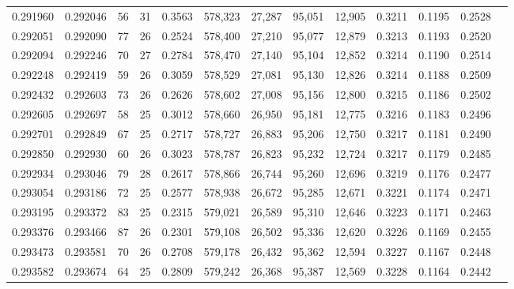 \begin{tabular}{rrrrrrrrrrrrr}
0.291960 & 0.292046 &  56 &  31 &                                     0.3563 & 578,323 &  27,287 &  95,051 &  12,905 & 0.3211 & 0.1195 & 0.2528 \\
0.292051 & 0.292090 &  77 &  26 &                                     0.2524 & 578,400 &  27,210 &  95,077 &  12,879 & 0.3213 & 0.1193 & 0.2520 \\
0.292094 & 0.292246 &  70 &  27 &                                     0.2784 & 578,470 &  27,140 &  95,104 &  12,852 & 0.3214 & 0.1190 & 0.2514 \\
0.292248 & 0.292419 &  59 &  26 &                                     0.3059 & 578,529 &  27,081 &  95,130 &  12,826 & 0.3214 & 0.1188 & 0.2509 \\
0.292432 & 0.292603 &  73 &  26 &                                     0.2626 & 578,602 &  27,008 &  95,156 &  12,800 & 0.3215 & 0.1186 & 0.2502 \\
0.292605 & 0.292697 &  58 &  25 &                                     0.3012 & 578,660 &  26,950 &  95,181 &  12,775 & 0.3216 & 0.1183 & 0.2496 \\
0.292701 & 0.292849 &  67 &  25 &                                     0.2717 & 578,727 &  26,883 &  95,206 &  12,750 & 0.3217 & 0.1181 & 0.2490 \\
0.292850 & 0.292930 &  60 &  26 &                                     0.3023 & 578,787 &  26,823 &  95,232 &  12,724 & 0.3217 & 0.1179 & 0.2485 \\
0.292934 & 0.293046 &  79 &  28 &                                     0.2617 & 578,866 &  26,744 &  95,260 &  12,696 & 0.3219 & 0.1176 & 0.2477 \\
0.293054 & 0.293186 &  72 &  25 &                                     0.2577 & 578,938 &  26,672 &  95,285 &  12,671 & 0.3221 & 0.1174 & 0.2471 \\
0.293195 & 0.293372 &  83 &  25 &                                     0.2315 & 579,021 &  26,589 &  95,310 &  12,646 & 0.3223 & 0.1171 & 0.2463 \\
0.293376 & 0.293466 &  87 &  26 &                                     0.2301 & 579,108 &  26,502 &  95,336 &  12,620 & 0.3226 & 0.1169 & 0.2455 \\
0.293473 & 0.293581 &  70 &  26 &                                     0.2708 & 579,178 &  26,432 &  95,362 &  12,594 & 0.3227 & 0.1167 & 0.2448 \\
0.293582 & 0.293674 &  64 &  25 &                                     0.2809 & 579,242 &  26,368 &  95,387 &  12,569 & 0.3228 & 0.1164 & 0.2442 \\

\end{tabular}
